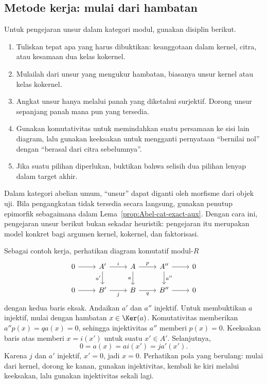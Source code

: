 \subsection*{Metode kerja: mulai dari hambatan}

Untuk pengejaran unsur dalam kategori modul, gunakan disiplin berikut.
\begin{enumerate}
	\item Tuliskan tepat apa yang harus dibuktikan: keanggotaan dalam kernel,
	citra, atau kesamaan dua kelas kokernel.
	\item Mulailah dari unsur yang mengukur hambatan, biasanya unsur kernel
	atau kelas kokernel.
	\item Angkat unsur hanya melalui panah yang diketahui surjektif. Dorong
	unsur sepanjang panah mana pun yang tersedia.
	\item Gunakan komutativitas untuk memindahkan suatu persamaan ke sisi lain
	diagram, lalu gunakan keeksakan untuk mengganti pernyataan ``bernilai nol''
	dengan ``berasal dari citra sebelumnya''.
	\item Jika suatu pilihan diperlukan, buktikan bahwa selisih dua pilihan
	lenyap dalam target akhir.
\end{enumerate}
Dalam kategori abelian umum, ``unsur'' dapat diganti oleh morfisme dari objek
uji. Bila pengangkatan tidak tersedia secara langsung, gunakan penutup
epimorfik sebagaimana dalam Lema~\ref{prop:Abel-cat-exact-aux}. Dengan cara
ini, pengejaran unsur berikut bukan sekadar heuristik: pengejaran itu merupakan model
konkret bagi argumen kernel, kokernel, dan faktorisasi.

Sebagai contoh kerja, perhatikan diagram komutatif modul-$R$
\[
\begin{tikzcd}
	0 \arrow[r] & A' \arrow[r, "i"] \arrow[d, "a'"'] & A \arrow[r, "p"] \arrow[d, "a"'] & A'' \arrow[r] \arrow[d, "a''"] & 0 \\
	0 \arrow[r] & B' \arrow[r, "j"'] & B \arrow[r, "q"'] & B'' \arrow[r] & 0
\end{tikzcd}
\]
dengan kedua baris eksak. Andaikan $a'$ dan $a''$ injektif. Untuk membuktikan
$a$ injektif, mulai dengan hambatan $x\in\Ker(a)$. Komutativitas memberikan
$a''p(x)=qa(x)=0$, sehingga injektivitas $a''$ memberi $p(x)=0$. Keeksakan
baris atas memberi $x=i(x')$ untuk suatu $x'\in A'$. Selanjutnya,
\[
	0=a(x)=a i(x')=j a'(x').
\]
Karena $j$ dan $a'$ injektif, $x'=0$, jadi $x=0$. Perhatikan pola yang
berulang: mulai dari kernel, dorong ke kanan, gunakan injektivitas, kembali
ke kiri melalui keeksakan, lalu gunakan injektivitas sekali lagi.

